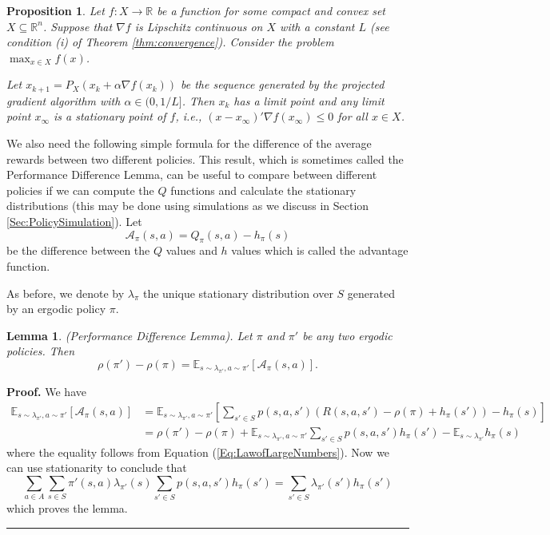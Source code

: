 \documentclass[letter,11pt]{article}
\newtheorem{lemma}{Lemma}[section]
\newtheorem{proposition}{Proposition}[section]
\newenvironment {proof}[1][Proof]{\noindent \textbf {#1.} }{\ \rule {0.5em}{0.5em}}
\begin{document}
\begin{proposition} \label{prop:projected}
    Let $f:X \rightarrow \mathbb{R}$ be a  function for some compact and convex set $X \subseteq \mathbb{R}^{n}$. Suppose that $\nabla f$ is Lipschitz continuous on $X$ with a constant $L$ (see condition (i) of Theorem \ref{thm:convergence}). Consider the problem $\max _{x \in X} f(x)$. 
    
    Let $x_{k+1}=P_{X} (x_{k} + \alpha \nabla f(x_{k}))$ be the sequence generated by the projected gradient algorithm with $\alpha \in (0,1/L]$. Then $x_{k}$ has a limit point and any limit point $x_{\infty}$ is a stationary point of $f$, i.e., $ (x-x_{\infty})' \nabla f(x_{\infty}) \leq 0$ for all $x \in X$. 
\end{proposition}

    We also need the following simple formula for the difference of the average rewards between two different policies. This result, which is sometimes called the Performance Difference Lemma, can be useful to compare between different policies if we can compute the $Q$ functions and calculate the stationary distributions (this may be done using simulations as we discuss in Section \ref{Sec:PolicySimulation}). Let $$\mathcal{A}_{\pi} (s,a) = Q_{\pi}(s,a) - h_{\pi}(s)$$ be the difference between the $Q$ values and $h$ values which is called the advantage function.

As before, we denote by $\lambda_{\pi}$ the unique stationary distribution over $S$ generated by an ergodic policy $\pi$. 

\begin{lemma} (Performance Difference Lemma). \label{Lemma:performance}
Let $\pi$ and $\pi'$ be any two ergodic policies. Then 
$$ \rho(\pi') - \rho(\pi) =   \mathbb{E}_{s \sim \lambda_{\pi'}, a \sim \pi'} [ \mathcal{A}_{\pi} (s,a) ]. $$    
\end{lemma}

\begin{proof}
    We have 
    \begin{align*}
        \mathbb{E}_{s \sim \lambda_{\pi'}, a \sim \pi'} [ \mathcal{A}_{\pi}  (s,a)] & =  \mathbb{E}_{s \sim \lambda_{\pi'}, a \sim \pi'} \left [  \sum _{s' \in S} p(s,a,s') \left (   R(s,a,s') - \rho (\pi) +  h_{\pi } (s') \right) - h_{\pi} (s) \right ] \\
         & =  \rho(\pi') - \rho(\pi)  + \mathbb{E}_{s \sim \lambda_{\pi'}, a \sim \pi'}  \sum _{s' \in S} p(s,a,s')  h_{\pi }  (s') - \mathbb{E}_{s \sim \lambda_{\pi'}} h_{\pi}(s) 
    \end{align*}
    where the equality follows from Equation (\ref{Eq:LawofLargeNumbers}). 
Now we can use stationarity to conclude that 
    $$ \sum _{a \in A} \sum _{s \in S} \pi' (s,a)\lambda_{ \pi' } (s)  \sum _{s' \in S}  p(s,a,s') h_{\pi}(s') =  \sum _{s' \in S} \lambda_{{\pi' } }  (s')  h_{\pi}(s')   $$
    which proves the lemma.   
\end{proof}
\end{document}
